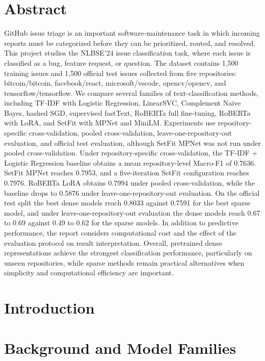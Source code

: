 \documentclass[12pt,a4paper]{report}
\begin{document}
\chapter*{Abstract}
GitHub issue triage is an important software-maintenance task in which incoming reports must be categorized before they can be prioritized, routed, and resolved. This project studies the NLBSE'24 issue classification task, where each issue is classified as a bug, feature request, or question. The dataset contains 1,500 training issues and 1,500 official test issues collected from five repositories: bitcoin/bitcoin, facebook/react, microsoft/vscode, opencv/opencv, and tensorflow/tensorflow. We compare several families of text-classification methods, including TF-IDF with Logistic Regression, LinearSVC, Complement Naive Bayes, hashed SGD, supervised fastText, RoBERTa full fine-tuning, RoBERTa with LoRA, and SetFit with MPNet and MiniLM. Experiments use repository-specific cross-validation, pooled cross-validation, leave-one-repository-out evaluation, and official test evaluation, although SetFit MPNet was not run under pooled cross-validation. Under repository-specific cross-validation, the TF-IDF + Logistic Regression baseline obtains a mean repository-level Macro-F1 of 0.7636. SetFit MPNet reaches 0.7953, and a five-iteration SetFit configuration reaches 0.7976. RoBERTa LoRA obtains 0.7994 under pooled cross-validation, while the baseline drops to 0.5876 under leave-one-repository-out evaluation. On the official test split the best dense models reach 0.8033 against 0.7591 for the best sparse model, and under leave-one-repository-out evaluation the dense models reach 0.67 to 0.69 against 0.49 to 0.62 for the sparse models. In addition to predictive performance, the report considers computational cost and the effect of the evaluation protocol on result interpretation. Overall, pretrained dense representations achieve the strongest classification performance, particularly on unseen repositories, while sparse methods remain practical alternatives when simplicity and computational efficiency are important.

\clearpage
\tableofcontents
\clearpage
{}

\chapter{Introduction}


\chapter{Background and Model Families}

\end{document}

